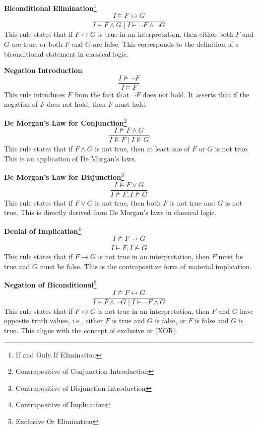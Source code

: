 \begin{center}
\begin{minipage}{.48\textwidth}
	\vspace{12pt}
	\item \textbf{Biconditional Elimination}\footnote{If and Only If Elimination}\[
	\frac{I\models F\leftrightarrow G}{I\models F\land G\mid I\models\lnot F\land\lnot G}
	\] This rule states that if $F\leftrightarrow G$ is true in an interpretation, then either both 
	$F$ and $G$ are true, or both $F$ and $G$ are false. This corresponds to the definition of a biconditional statement in classical logic.
\end{minipage}\quad
\begin{minipage}{.48\textwidth}
\item \textbf{Negation Introduction} \[
\frac{I\not\models \lnot F}{I\models F}
\] This rule introduces $F$ from the fact that $\lnot F$ does not hold. It asserts that if the negation of $F$ does not hold, then $F$ must hold.
\vspace{12pt}
\item \textbf{De Morgan's Law for Conjunction}\footnote{Contrapositive of Conjunction Introduction}\[
\frac{I\not\models F\land G}{I\not\models F \mid I\not\models G}
\] This rule states that if 
$F\land G$ is not true, then at least one of $F$ or $G$ is not true. This is an application of De Morgan's laws.
\vspace{12pt}
\item \textbf{De Morgan's Law for Disjunction}\footnote{Contrapositive of Disjunction Introduction}\[
\frac{I\not\models F\lor G}{I\not\models F, I\not\models G}
\] This rule states that if $F\lor G$ is not true, then both $F$ is not true and $G$ is not true.  This is directly derived from De Morgan's laws in classical logic.
\vspace{12pt}
\item \textbf{Denial of Implication}\footnote{Contrapositive of Implication} \[
\frac{I\not\models F\to G}{I\models F, I\not\models G}
\] This rule states that if $F\to G$ is not true in an interpretation, then 
$F$ must be true and $G$ must be false. This is the contrapositive form of material implication.
\vspace{12pt}
\item \textbf{Negation of Biconditional}\footnote{Exclusive Or Elimination} \[
\frac{I\not\models F\leftrightarrow G}{I\models F\land \lnot G\mid I\models\lnot F\land G}
\] This rule states that if $F\leftrightarrow G$ is not true in an interpretation, then $F$ and 
$G$ have opposite truth values, i.e., either $F$ is true and $G$ is false, or $F$ is false and $G$ is true.
This aligns with the concept of exclusive or (XOR).
\end{minipage}
\end{center}
